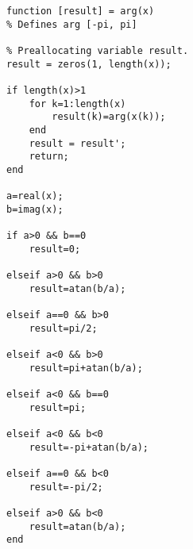 \begin{verbatim}
function [result] = arg(x)
% Defines arg [-pi, pi]

% Preallocating variable result.
result = zeros(1, length(x));

if length(x)>1
	for k=1:length(x)
		result(k)=arg(x(k));
	end
	result = result';
	return;
end
	
a=real(x); 
b=imag(x);

if a>0 && b==0
    result=0;

elseif a>0 && b>0
    result=atan(b/a);
    
elseif a==0 && b>0
    result=pi/2;
    
elseif a<0 && b>0
    result=pi+atan(b/a);
    
elseif a<0 && b==0
    result=pi;
    
elseif a<0 && b<0
    result=-pi+atan(b/a);
    
elseif a==0 && b<0
    result=-pi/2;
    
elseif a>0 && b<0
    result=atan(b/a);
end

\end{verbatim}

